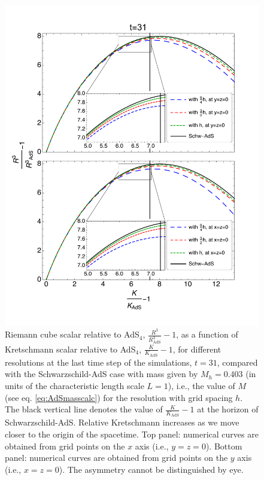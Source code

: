 \documentclass[a4paper,11pt]{article}
\numberwithin{equation}{section}
\begin{document}
\begin{figure}[!h]
        \centering
        \includegraphics[width=5.25in,clip=true]{plots/bulkplots/compare_res/relriemanncube-relkretsch/combined_withzoom_fullplotrelRieCubeofrelkretschallres.pdf}
\parbox{5.0in}{\caption{Riemann cube scalar relative to AdS$_4$, $\frac{R^3}{R^3_{\text{AdS}}}-1$, as a function of Kretschmann scalar relative to AdS$_4$, $\frac{K}{K_{\text{AdS}}}-1$, for different resolutions at the last time step of the simulations, $t=31$, compared with the Schwarzschild-AdS case with mass given by $M_h=0.403$ (in units of the characteristic length scale $L=1$), i.e., the value of $M$ (see eq. \eqref{eq:AdSmasscalc}) for the resolution with grid spacing $h$. The black vertical line denotes the value of $\frac{K}{K_{\text{AdS}}}-1$ at the horizon of Schwarzschild-AdS. Relative Kretschmann increases as we move closer to the origin of the spacetime. Top panel: numerical curves are obtained from grid points on the $x$ axis (i.e., $y=z=0$). Bottom panel: numerical curves are obtained from grid points on the $y$ axis (i.e., $x=z=0$). The asymmetry cannot be distinguished by eye.
        }\label{fig:relRiemanncube-relKretschmann-comparison-SchwAdS}}
\end{figure}
\end{document}
